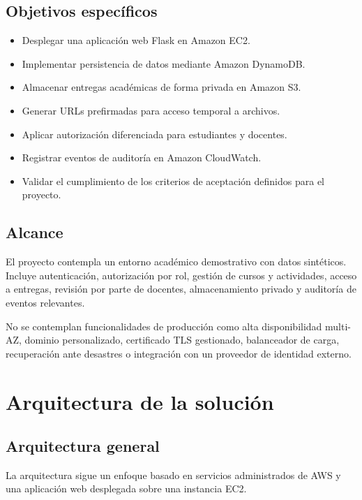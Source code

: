 \documentclass[11pt,letterpaper]{article}
\begin{document}
\subsection{Objetivos específicos}

\begin{itemize}[leftmargin=*,itemsep=1.5pt,topsep=2pt]
    \item Desplegar una aplicación web Flask en Amazon EC2.
    \item Implementar persistencia de datos mediante Amazon DynamoDB.
    \item Almacenar entregas académicas de forma privada en Amazon S3.
    \item Generar URLs prefirmadas para acceso temporal a archivos.
    \item Aplicar autorización diferenciada para estudiantes y docentes.
    \item Registrar eventos de auditoría en Amazon CloudWatch.
    \item Validar el cumplimiento de los criterios de aceptación definidos para el proyecto.
\end{itemize}

\subsection{Alcance}

El proyecto contempla un entorno académico demostrativo con datos sintéticos. Incluye autenticación, autorización por rol, gestión de cursos y actividades, acceso a entregas, revisión por parte de docentes, almacenamiento privado y auditoría de eventos relevantes.

No se contemplan funcionalidades de producción como alta disponibilidad multi-AZ, dominio personalizado, certificado TLS gestionado, balanceador de carga, recuperación ante desastres o integración con un proveedor de identidad externo.

\section{Arquitectura de la solución}

\subsection{Arquitectura general}

La arquitectura sigue un enfoque basado en servicios administrados de AWS y una aplicación web desplegada sobre una instancia EC2.
\end{document}
